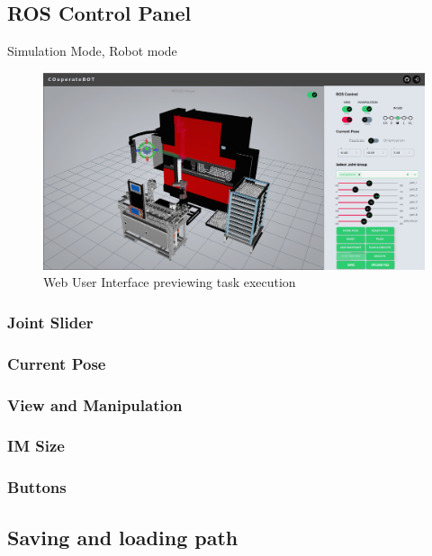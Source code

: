 \subsection{ROS Control Panel}
\label{subsec:web-ui-ros-control}
Simulation Mode, Robot mode


\begin{figure}[h]
    \centering
    \includegraphics[width=1\textwidth]{figures/webui/web-ui-preview.png}
    \caption{Web User Interface previewing task execution}
    \label{fig:web-ui-preview}
\end{figure}

\subsubsection{Joint Slider}
\label{subsubsec:web-ui-joint-slider}

\subsubsection{Current Pose}
\label{subsubsec:web-ui-current-pose}

\subsubsection{View and Manipulation}
\label{subsubsec:web-ui-view-manipulation}

\subsubsection{IM Size}
\label{subsubsec:web-ui-im-size}


\subsubsection{Buttons}
\label{subsubsec:web-ui-buttons}

\subsection{Saving and loading path}
\label{subsec:web-ui-saving-path}

